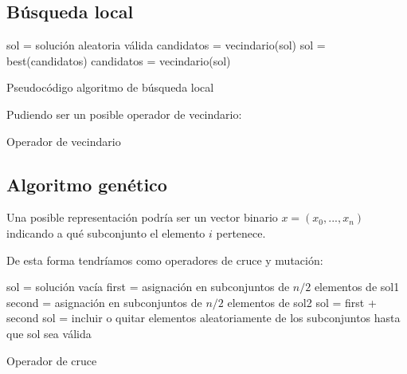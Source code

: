 \documentclass[13pt,a4paper]{article}
\begin{document}
\newpage

\subsection{Búsqueda local}

\begin{algorithm}[H]
    \SetAlgoLined
        sol = solución aleatoria válida \;
        candidatos = vecindario(sol) \;
         {
            sol = best(candidatos) \;
            candidatos = vecindario(sol) \;
        }        
    \caption{Pseudocódigo algoritmo de búsqueda local}
\end{algorithm}

\vspace{\baselineskip}

Pudiendo ser un posible operador de vecindario:

\begin{algorithm}[H]
    \SetAlgoLined
    \caption{Operador de vecindario}
\end{algorithm}


\subsection{Algoritmo genético}

Una posible representación podría ser un vector binario $x = (x_{0}, ..., x_{n})$ indicando a qué subconjunto el elemento $i$ pertenece.

\vspace{\baselineskip}

De esta forma tendríamos como operadores de cruce y mutación:

\begin{algorithm}[H]
    \SetAlgoLined
        sol = solución vacía \;
        first = asignación en subconjuntos de $n/2$ elementos de sol1 \;
        second = asignación en subconjuntos de $n/2$ elementos de sol2 \;
        sol = first + second \;
        sol = incluir o quitar elementos aleatoriamente de los subconjuntos hasta que sol sea válida \;
    \caption{Operador de cruce}
\end{algorithm}

\vspace{\baselineskip}
\end{document}

